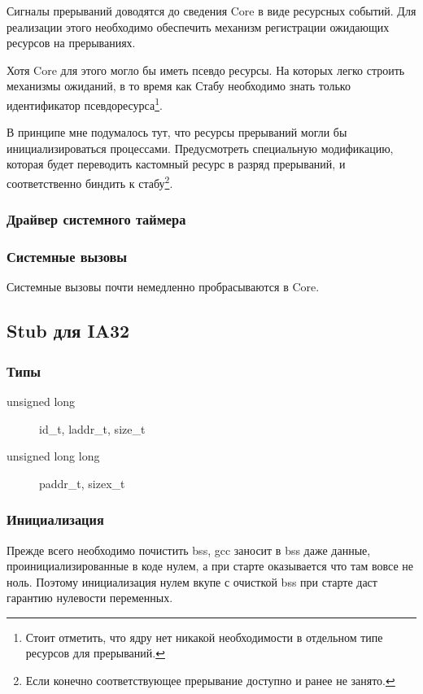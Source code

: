 Сигналы прерываний доводятся до сведения Core в виде ресурсных событий. Для
реализации этого необходимо обеспечить механизм регистрации ожидающих ресурсов
на прерываниях.

Хотя Core для этого могло бы иметь псевдо ресурсы. На которых легко строить
механизмы ожиданий, в то время как Стабу необходимо знать только идентификатор
псевдоресурса\footnote{Стоит отметить, что ядру нет никакой необходимости в
отдельном типе ресурсов для прерываний.}.

В принципе мне подумалось тут, что ресурсы прерываний могли бы
инициализироваться процессами. Предусмотреть специальную модификацию, которая
будет переводить кастомный ресурс в разряд прерываний, и соответственно биндить
к стабу\footnote{Если конечно соответствующее прерывание доступно и ранее не
занято.}.

\subsubsection{Драйвер системного таймера}

\subsubsection{Системные вызовы}

Системные вызовы почти немедленно пробрасываются в Core.

\subsection{Stub для IA32}

\subsubsection{Типы}

\begin{description}
\item[unsigned long] id\_t, laddr\_t, size\_t
\item[unsigned long long] paddr\_t, sizex\_t
\end{description}

\subsubsection{Инициализация}

Прежде всего необходимо почистить bss, gcc заносит в bss даже данные,
проинициализированные в коде нулем, а при старте оказывается что там вовсе не
ноль. Поэтому инициализация нулем вкупе с очисткой bss при старте даст гарантию
нулевости переменных.

